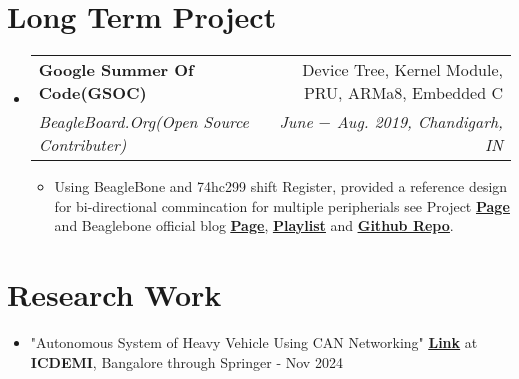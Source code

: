 \documentclass[letterpaper,11pt]{article}
\makeatletter
\newcommand{\resumeItem}[1]{
  \item\small{
    {#1 \vspace{-2pt}}
  }
}
\newcommand{\resumeSubheading}[4]{
  \vspace{-2pt}\item
    \begin{tabular*}{0.97\textwidth}[t]{l@{\extracolsep{\fill}}r}
      \textbf{#1} & #2 \\
      \textit{\small#3} & \textit{\small #4} \\
    \end{tabular*}\vspace{-9pt}
}
\newcommand{\resumeSubHeadingListStart}{\begin{itemize}[leftmargin=0.15in, label={}]}
\newcommand{\resumeSubHeadingListEnd}{\end{itemize}}
\newcommand{\resumeItemListStart}{\begin{itemize}}
\newcommand{\resumeItemListEnd}{\end{itemize}\vspace{-9pt}}
\makeatother
\begin{document}
\section{Long Term Project}
  \resumeSubHeadingListStart
    \resumeSubheading
      {Google Summer Of Code(GSOC)}{Device Tree, Kernel Module, PRU, ARMa8, Embedded C}
      {BeagleBoard.Org(Open Source Contributer) }{June $-$ Aug. 2019, Chandigarh, IN}
      \resumeItemListStart
        \resumeItem{Using BeagleBone and 74hc299 shift Register, provided a reference design for bi-directional commincation for multiple peripherials see Project \textbf{\href{https://elinux.org/Beagleboard_gsoc_2019_bi-directional_progress}{\underline{Page}}} and Beaglebone official blog \textbf{\href{https://beagleboard.org/blog/2019-06-02-beagleboard-org-community-kicks-off-gsoc-2019-with-four-projects}{\underline{Page}}}, \textbf{\href{https://www.youtube.com/watch?v=ZZDT6jNslqw&list=PLttoix_9Us2yHM4zNr08ynm4iwXZTgxam}{\underline{Playlist}}} and  \textbf{\href{https://github.com/pranav083/pocket_beagle-work}{\underline{Github Repo}}}.}
    \resumeItemListEnd

  \resumeSubHeadingListEnd\vspace{-20pt}


\section{Research Work}

\begin{itemize}
  \item "Autonomous System of Heavy Vehicle Using CAN Networking" \underline{\textbf{\href{https://doi.org/10.1007/978-981-97-7616-0_7}{Link}}} at {\textbf{ICDEMI}}, Bangalore through Springer - Nov 2024
\end{itemize}\vspace{-30pt}




\end{document}
